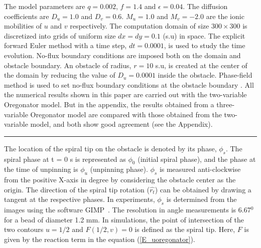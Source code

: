 \documentclass[%
 preprint,
 amsmath,amssymb,
 aps,
]{revtex4-2}
\begin{document}
The model parameters are $q = 0.002$, $f = 1.4$ and $\epsilon=0.04$. The diffusion coefficients are $D_{u}=1.0$ and $D_{v}=0.6$. $M_{u}=1.0$ and $M_{v}=-2.0$ are the ionic mobilities of $u$ and $v$ respectively. The computation domain of size $300 \times 300$ is discretized into grids of uniform size $dx=dy=0.1$ (s.u) in space. The explicit forward Euler method with a time step, $dt=0.0001$, is used to study the time evolution. No-flux boundary conditions are imposed both on the domain and obstacle boundary. An obstacle of radius, $r = 10$ s.u, is created at the center of the domain by reducing the value of $D_{u}=0.0001$ inside the obstacle. Phase-field method is used to set no-flux boundary conditions at the obstacle boundary \cite{fenton2005modeling}. 
All the numerical results shown in this paper are carried out with the two-variable Oregonator model. But in the appendix, the results obtained from a three-variable Oregonator model are compared with those obtained from the two-variable model, and both show good agreement (see the Appendix).
 

\vspace{5pt}
\hrule
\vspace{5pt}


The location of the spiral tip on the obstacle is denoted by its phase, $\phi_s$. The spiral phase at t = 0 s is represented as $\phi_0$ (initial spiral phase), and the phase at the time of unpinning is $\phi_u$ (unpinning phase). $\phi_s$ is measured anti-clockwise from the positive X-axis in degree by considering the obstacle center as the origin.
The direction of the spiral tip rotation ($\hat{r_t}$) can be obtained by drawing a tangent at the respective phases. In experiments, $\phi_s$ is determined from the images using the software GIMP~\cite{gimp}.
The resolution in angle measurements is 6.67$^0$ for a bead of diameter 1.2 mm.
In simulations, the point of intersection of the two contours
$u=1/2$ and $F(1/2,v) = 0$  is defined as the spiral tip. Here, $F$ is given by the reaction term in the equation 
(\ref{E_uoregonator})\cite{barkley1991model}.

\end{document}
